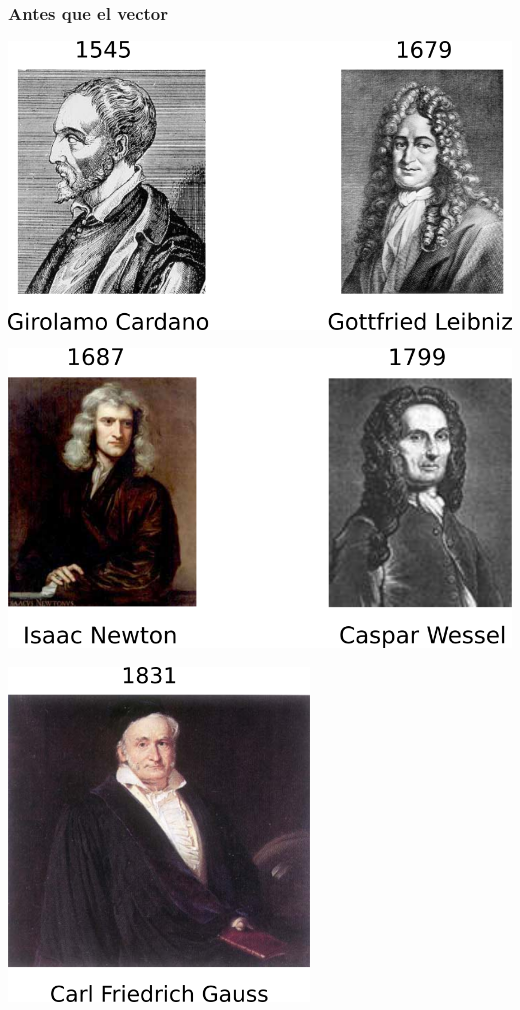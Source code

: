 \documentclass{beamer}
\begin{document}
\begin{frame}
    \frametitle{Antes que el vector}
    \includegraphics[width=\textwidth]{../gfx/cardano-leibniz}
\end{frame}

\begin{frame}
    \includegraphics[width=\textwidth]{../gfx/newton-wessel}
\end{frame}

\begin{frame}
    \begin{center}
        \includegraphics[width=0.6\textwidth]{../gfx/gauss-frame}
    \end{center}
\end{frame}
\end{document}

